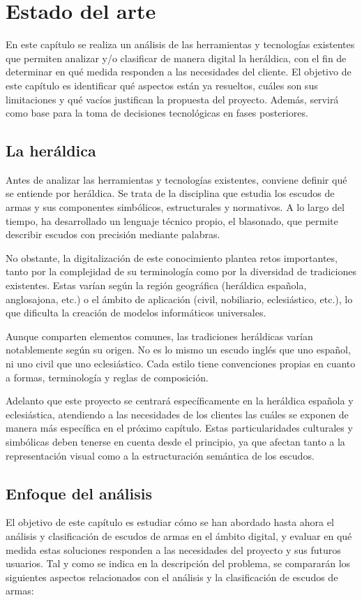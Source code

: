 \chapter{Estado del arte}

En este capítulo se realiza un análisis de las herramientas y tecnologías
existentes que permiten analizar y/o clasificar de manera digital la heráldica, con el fin
de determinar en qué medida responden a las necesidades del cliente.
El objetivo de este capítulo es identificar qué aspectos están ya resueltos,
cuáles son sus limitaciones y qué vacíos justifican la propuesta del proyecto.
Además, servirá como base para la toma de decisiones tecnológicas en fases posteriores.

\section{La heráldica}

Antes de analizar las herramientas y tecnologías existentes, conviene definir qué se entiende 
por heráldica. Se trata de la disciplina que estudia los escudos de armas y sus componentes 
simbólicos, estructurales y normativos.  
A lo largo del tiempo, ha desarrollado un lenguaje técnico propio, el blasonado, que permite 
describir escudos con precisión mediante palabras.  

No obstante, la digitalización de este conocimiento plantea retos importantes, tanto por la 
complejidad de su terminología como por la diversidad de tradiciones existentes. Estas varían 
según la región geográfica (heráldica española, anglosajona, etc.) o el ámbito de aplicación 
(civil, nobiliario, eclesiástico, etc.), lo que dificulta la creación de modelos informáticos 
universales.

Aunque comparten elementos comunes, las tradiciones heráldicas varían notablemente 
según su origen. No es lo mismo un escudo inglés que uno español, ni uno civil que 
uno eclesiástico. Cada estilo tiene convenciones propias en cuanto a formas, 
terminología y reglas de composición.

Adelanto que este proyecto se centrará específicamente en la heráldica española y eclesiástica, 
atendiendo a las necesidades de los clientes las cuáles se exponen de manera más específica en 
el próximo capítulo. Estas particularidades culturales y simbólicas deben tenerse en cuenta 
desde el principio, ya que afectan tanto a la representación visual como a la estructuración 
semántica de los escudos.

\section{Enfoque del análisis}
El objetivo de este capítulo es estudiar cómo se han abordado hasta ahora el análisis y
clasificación de escudos de armas en el ámbito digital, y evaluar en qué medida estas soluciones 
responden a las necesidades del proyecto y sus futuros usuarios.
Tal y como se indica en la descripción del problema, se compararán los siguientes aspectos 
relacionados con el análisis y la clasificación de escudos de armas:

